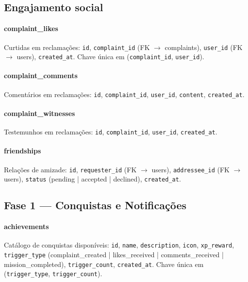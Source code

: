 \subsection*{Engajamento social}

\paragraph{complaint\_likes}
Curtidas em reclamações: \texttt{id}, \texttt{complaint\_id}
(FK $\to$ complaints), \texttt{user\_id} (FK $\to$ users),
\texttt{created\_at}. Chave única em (\texttt{complaint\_id}, \texttt{user\_id}).

\paragraph{complaint\_comments}
Comentários em reclamações: \texttt{id}, \texttt{complaint\_id},
\texttt{user\_id}, \texttt{content}, \texttt{created\_at}.

\paragraph{complaint\_witnesses}
Testemunhos em reclamações: \texttt{id}, \texttt{complaint\_id},
\texttt{user\_id}, \texttt{created\_at}.

\paragraph{friendships}
Relações de amizade: \texttt{id}, \texttt{requester\_id}
(FK $\to$ users), \texttt{addressee\_id} (FK $\to$ users),
\texttt{status} (pending | accepted | declined), \texttt{created\_at}.

\subsection*{Fase 1 — Conquistas e Notificações}

\paragraph{achievements}
Catálogo de conquistas disponíveis: \texttt{id}, \texttt{name},
\texttt{description}, \texttt{icon}, \texttt{xp\_reward},
\texttt{trigger\_type} (complaint\_created | likes\_received |
comments\_received | mission\_completed), \texttt{trigger\_count},
\texttt{created\_at}. Chave única em (\texttt{trigger\_type},
\texttt{trigger\_count}).

